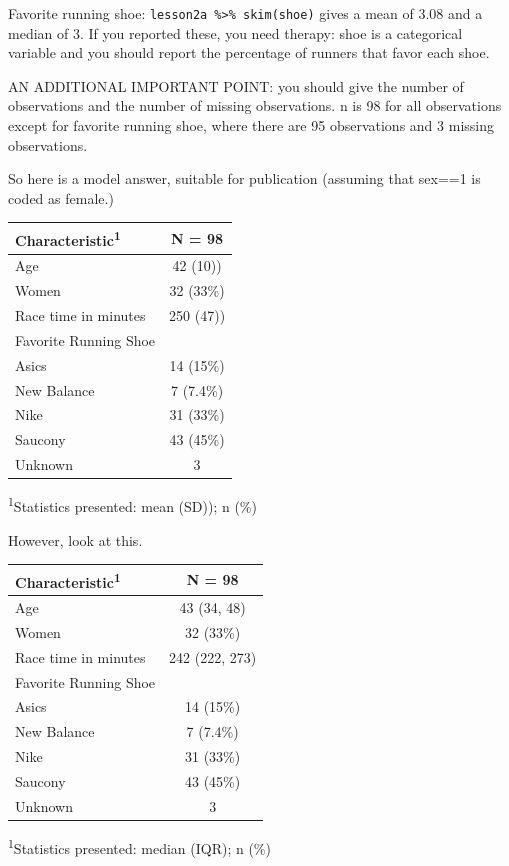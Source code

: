 \documentclass[]{book}
\begin{document}
Favorite running shoe: \texttt{lesson2a\ \%\textgreater{}\%\ skim(shoe)} gives a mean of 3.08 and a median of 3. If you reported these, you need therapy: shoe is a categorical variable and you should report the percentage of runners that favor each shoe.

AN ADDITIONAL IMPORTANT POINT: you should give the number of observations and the number of missing observations. n is 98 for all observations except for favorite running shoe, where there are 95 observations and 3 missing observations.

So here is a model answer, suitable for publication (assuming that sex==1 is coded as female.)

\captionsetup[table]{labelformat=empty,skip=1pt}
\begin{longtable}{lc}
\toprule
\textbf{Characteristic}\textsuperscript{1} & \textbf{N = 98} \\ 
\midrule
Age & 42 (10)) \\ 
Women & 32 (33\%) \\ 
Race time in minutes & 250 (47)) \\ 
Favorite Running Shoe &  \\ 
Asics & 14 (15\%) \\ 
New Balance & 7 (7.4\%) \\ 
Nike & 31 (33\%) \\ 
Saucony & 43 (45\%) \\ 
Unknown & 3 \\ 
\bottomrule
\end{longtable}
\vspace{-5mm}
\begin{minipage}{\linewidth}
\textsuperscript{1}Statistics presented: mean (SD)); n (\%) \\ 
\end{minipage}

However, look at this.

\captionsetup[table]{labelformat=empty,skip=1pt}
\begin{longtable}{lc}
\toprule
\textbf{Characteristic}\textsuperscript{1} & \textbf{N = 98} \\ 
\midrule
Age & 43 (34, 48) \\ 
Women & 32 (33\%) \\ 
Race time in minutes & 242 (222, 273) \\ 
Favorite Running Shoe &  \\ 
Asics & 14 (15\%) \\ 
New Balance & 7 (7.4\%) \\ 
Nike & 31 (33\%) \\ 
Saucony & 43 (45\%) \\ 
Unknown & 3 \\ 
\bottomrule
\end{longtable}
\vspace{-5mm}
\begin{minipage}{\linewidth}
\textsuperscript{1}Statistics presented: median (IQR); n (\%) \\ 
\end{minipage}
\end{document}
